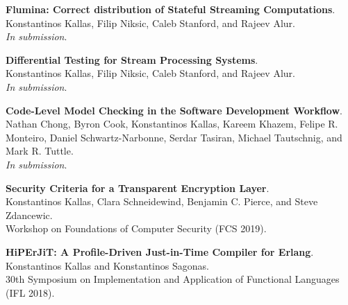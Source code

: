 \textbf{Flumina: Correct distribution of Stateful Streaming Computations}. \\
Konstantinos Kallas, Filip Niksic, Caleb Stanford, and Rajeev Alur. \\
\emph{In submission}.

\textbf{Differential Testing for Stream Processing Systems}. \\
Konstantinos Kallas, Filip Niksic, Caleb Stanford, and Rajeev Alur. \\
\emph{In submission}.

\textbf{Code-Level Model Checking in the Software Development Workflow}. \\
Nathan Chong, Byron Cook, Konstantinos Kallas, Kareem Khazem, Felipe R. Monteiro, Daniel Schwartz-Narbonne, Serdar Tasiran, Michael Tautschnig, and Mark R. Tuttle. \\
\emph{In submission}.

\textbf{Security Criteria for a Transparent Encryption Layer}. \\
Konstantinos Kallas, Clara Schneidewind, Benjamin C. Pierce, and Steve Zdancewic. \\
Workshop on Foundations of Computer Security (FCS 2019).

\textbf{HiPErJiT: A Profile-Driven Just-in-Time Compiler for Erlang}. \\
Konstantinos Kallas and Konstantinos Sagonas. \\
30th Symposium on Implementation and Application of Functional Languages (IFL 2018).


